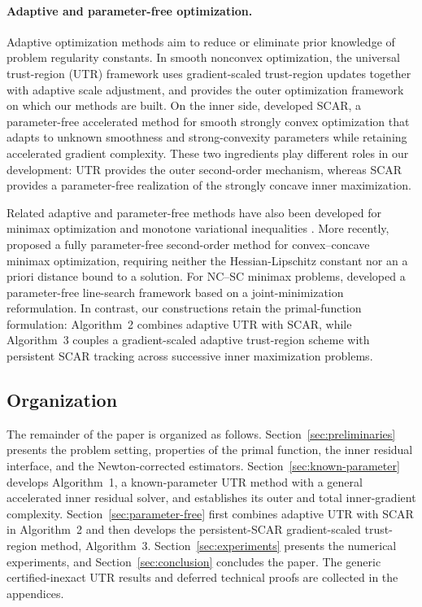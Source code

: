 \paragraph{Adaptive and parameter-free optimization.}
Adaptive optimization methods aim to reduce or eliminate prior
knowledge of problem regularity constants. In smooth nonconvex
optimization, the universal trust-region (UTR) framework
\citep{jiang2026utr} uses gradient-scaled trust-region updates together
with adaptive scale adjustment, and provides the outer optimization
framework on which our methods are built. On the inner side,
\citet{lan2026optimal} developed SCAR, a parameter-free accelerated
method for smooth strongly convex optimization that adapts to unknown
smoothness and strong-convexity parameters while retaining accelerated
gradient complexity. These two ingredients play different roles in
our development: UTR provides the outer second-order mechanism, whereas
SCAR provides a parameter-free realization of the strongly concave
inner maximization.

Related adaptive and parameter-free methods have also been developed
for minimax optimization and monotone variational inequalities
\citep{jiang2024adaptive,jiang2025generalized}.
More recently, \citet{wang2026parameterfree} proposed a fully
parameter-free second-order method for convex--concave minimax
optimization, requiring neither the Hessian-Lipschitz constant nor an
a priori distance bound to a solution. For NC--SC minimax problems,
\citet{ma2026linesearch} developed a parameter-free line-search
framework based on a joint-minimization reformulation.
In contrast, our constructions retain the primal-function formulation:
Algorithm~2 combines adaptive UTR with SCAR, while Algorithm~3 couples
a gradient-scaled adaptive trust-region scheme with persistent SCAR
tracking across successive inner maximization problems.


\subsection{Organization}

The remainder of the paper is organized as follows.
Section~\ref{sec:preliminaries} presents the problem setting,
properties of the primal function, the inner residual interface, and
the Newton-corrected estimators.
Section~\ref{sec:known-parameter} develops Algorithm~1, a
known-parameter UTR method with a general accelerated inner residual
solver, and establishes its outer and total inner-gradient
complexity.
Section~\ref{sec:parameter-free} first combines adaptive UTR with SCAR
in Algorithm~2 and then develops the persistent-SCAR
gradient-scaled trust-region method, Algorithm~3.
Section~\ref{sec:experiments} presents the numerical experiments, and
Section~\ref{sec:conclusion} concludes the paper.
The generic certified-inexact UTR results and deferred technical
proofs are collected in the appendices.
